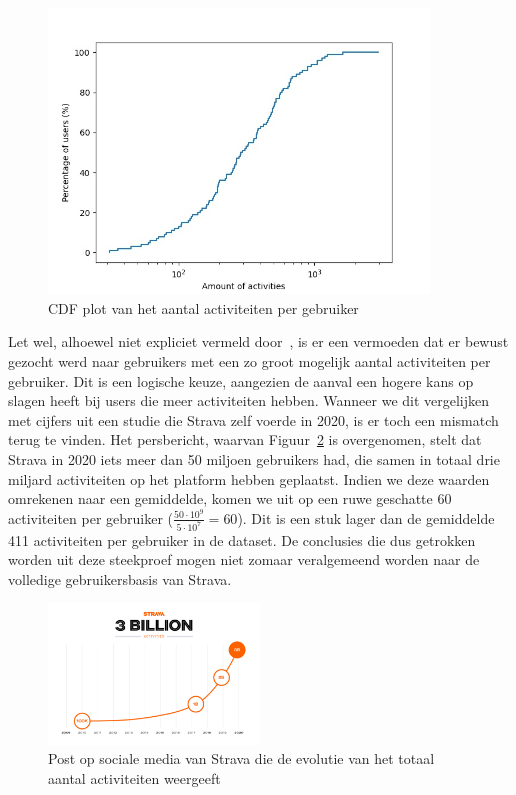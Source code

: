 \begin{figure}[h]
    \centering
    \includegraphics[width=0.9\textwidth]{fig/Afwijkingen&Analyses/CDF_amountActivities.jpg}
    \caption{\ac{CDF} plot van het aantal activiteiten per gebruiker}\label{fig:cdf_amount_activities}
\end{figure}

Let wel, alhoewel niet expliciet vermeld
door~\citeauthor{Dhondt_Pochat_Voulimeneas_Joosen_Volckaert_2022}, is er een
vermoeden dat er bewust gezocht werd naar gebruikers met een zo groot mogelijk
aantal activiteiten per gebruiker. Dit is een logische keuze, aangezien de
aanval een hogere kans op slagen heeft bij users die meer activiteiten hebben.
Wanneer we dit vergelijken met cijfers uit een studie die Strava zelf voerde in
2020, is er toch een mismatch terug te vinden\cite{StravaMi72:online}. Het
persbericht, waarvan Figuur~\ref{fig:3billionUsers} is overgenomen, stelt dat
Strava in 2020 iets meer dan 50 miljoen gebruikers had, die samen in totaal
drie miljard activiteiten op het platform hebben geplaatst. Indien we deze
waarden omrekenen naar een gemiddelde, komen we uit op een ruwe geschatte 60
activiteiten per gebruiker ($\frac{50 \cdot 10^9}{5 \cdot 10^7} = 60 $). Dit is
een stuk lager dan de gemiddelde 411 activiteiten per gebruiker in de dataset.
De conclusies die dus getrokken worden uit deze steekproef mogen niet zomaar
veralgemeend worden naar de volledige gebruikersbasis van Strava.
\begin{figure}[H]
    \centering
    \includegraphics[width=0.5\textwidth]{fig/Strava_3billion.png}
    \caption{Post op sociale media van Strava die de evolutie van het totaal aantal activiteiten weergeeft\cite{StravaMi72:online}}\label{fig:3billionUsers}
\end{figure}


